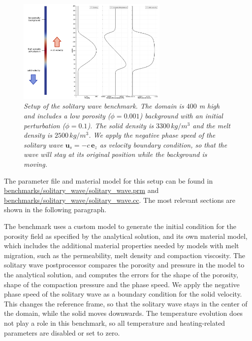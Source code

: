 \documentclass{article}
\begin{document}
\begin{figure}
  \begin{center}
    \includegraphics[width=0.65\textwidth]{cookbooks/benchmarks/solitary_wave/setup.pdf}
  \end{center}
  \caption{\it Setup of the solitary wave benchmark. The domain is $400$ m high and includes a low porosity
  ($\phi = 0.001$) background with an initial perturbation ($\phi = 0.1$). The solid density is $3300\,kg/m^3$
  and the melt density is $2500\,kg/m^3$. We apply the negative phase speed 
  of the solitary wave $\mathbf u_s = -c \, \mathbf e_z$ as velocity boundary condition, so that the wave will 
  stay at its original position while the background is moving.}
  \label{fig:setup-solitary-wave}
\end{figure}

The parameter file and material model for this setup can be found in \url{benchmarks/solitary_wave/solitary_wave.prm} and \url{benchmarks/solitary_wave/solitary_wave.cc}. The most relevant sections are shown in the following paragraph. 



The benchmark uses a custom model to generate the initial condition for the porosity field as specified by the analytical solution, and its own material model, which includes the additional material properties needed by models with melt migration, such as the permeability, melt density and compaction viscosity. The solitary wave postprocessor compares the porosity and pressure in the model to the analytical solution, and computes the errors for the shape of the porosity, shape of the compaction pressure and the phase speed. 
We apply the negative phase speed of the solitary wave as a boundary condition for the solid velocity. This changes the reference frame, so that the solitary wave stays in the center of the domain, while the solid moves downwards. The temperature evolution does not play a role in this benchmark, so all temperature and heating-related parameters are disabled or set to zero. 
\end{document}
